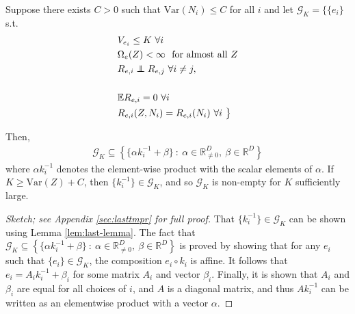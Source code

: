 
\medskip

\begin{theorem}
	\label{thm:lastthm}
	Suppose there exists $C>0$ such that $\text{Var}(N_i) \leq C$ for all $i$ and let $\mathcal{G}_K = \big\lbrace
	\{{e}_i \}$ s.t.
	\begin{align}
	& V_{{e}_i} \leq K \ \forall i \label{eq:resid_1}\\
	& \Omega_{{e}}(Z) < \infty \  \text{ for almost all } Z \label{eq:resid_2}\\
	&R_{{e}, i} \independent R_{{e}, j} \ \forall i \not= j, \label{eq:resid_3}\\
	\nonumber \\    &\mathbb{E} R_{{e}, i} = 0 \ \forall i \label{eq:resid_5} \\
	&R_{{e}, i}(Z, N_i) = R_{{e}, i}(N_i) \ \forall i \ \big\rbrace \label{eq:resid_6}
	\end{align}
	
	Then,
	\begin{align*}
	\mathcal{G}_K \subseteq\left\lbrace \{ {\alpha} {k}^{-1}_i + {\beta} \} \ : \ {\alpha} \in \mathbb{R}^{D}_{\not=0}, \: {\beta} \in \mathbb{R}^{D} \right\rbrace
	\end{align*}
	where $\alpha {k}^{-1}_i$ denotes the element-wise product with the scalar elements of ${\alpha}$.
	If $K \geq \text{Var}(Z) + C$, then $ \{ {k}^{-1}_i \}  \in \mathcal{G}_K$,
	and so $\mathcal{G}_K$ is non-empty for $K$ sufficiently large.
\end{theorem}
\begin{proof}[Sketch; see Appendix \ref{sec:lasttmpr} for full proof]
That $\{ {k}^{-1}_i \}  \in \mathcal{G}_K$ can be shown using Lemma \ref{lem:last-lemma}. 
The fact that $\mathcal{G}_K \subseteq\left\lbrace \{ {\alpha} {k}^{-1}_i + {\beta} \} \ : \ {\alpha} \in \mathbb{R}^{D}_{\not=0}, \: {\beta} \in \mathbb{R}^{D} \right\rbrace$ is proved by showing that for any $e_i$ such that $\{e_i\} \in \mathcal{G}_K$, the composition $e_i \circ k_i$ is affine.
It follows that $e_i = A_i k_i^{-1} + \beta_i$ for some matrix $A_i$ and vector $\beta_i$. 
Finally, it is shown that $A_i$ and $\beta_i$ are equal for all choices of $i$, and $A$ is a diagonal matrix, and thus $A k_i^{-1}$ can be written as an elementwise product with a vector $\alpha$.
\end{proof}

